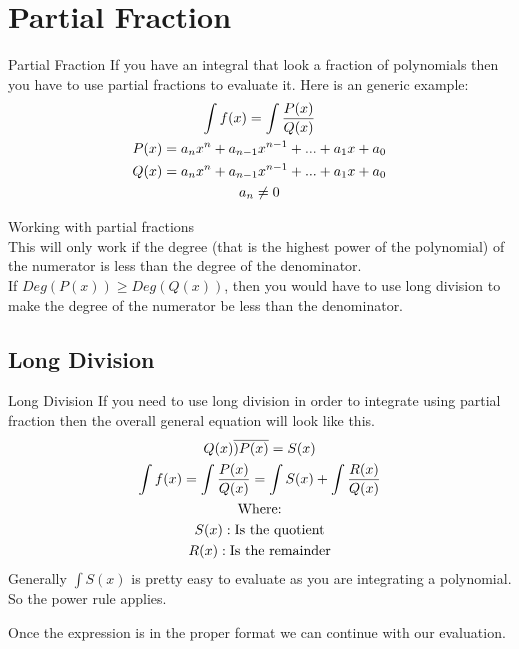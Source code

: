 \documentclass[letterpaper,10pt,twoside,twocolumn,openany]{book}
\begin{document}
\section{Partial Fraction}
\begin{paperbox}{Partial Fraction}
    If you have an integral that look a fraction of polynomials then you have to use partial fractions to evaluate it. Here is an generic example:
    \begin{gather}
        \int f(x) = \large\int \frac{P(x)}{Q(x)}\\
        \nonumber
        P(x) = a_nx^n + a_{n-1}x^{n-1} + ... + a_1x + a_0\\
        \nonumber
        Q(x) = a_nx^n + a_{n-1}x^{n-1} + ... + a_1x + a_0\\
        \nonumber
        a_n \neq 0
    \end{gather}
\end{paperbox}
\begin{commentbox}{Working with partial fractions}\\
    This will only work if the degree (that is the highest power of the polynomial) of the numerator is less than the degree of the denominator.\\
    If $Deg(P(x)) \geq Deg(Q(x)) $, then you would have to use long division to make the degree of the numerator be less than the denominator.
\end{commentbox}


\subsection{Long Division}
\begin{paperbox}{Long Division}
    If you need to use long division in order to integrate using partial fraction then the overall general equation will look like this.
    \begin{gather}
        Q(x)\overline{)P(x)} = S(x)\\
        \int f(x) = \large\int \frac{P(x)}{Q(x)} = \int S(x) + \large\int \frac{R(x)}{Q(x)}\\
        \nonumber
        \text{Where:}\\
        \nonumber
        S(x): \text{Is the quotient}\\
        \nonumber
        R(x): \text{Is the remainder}
    \end{gather}
    Generally $\int S(x)$ is pretty easy to evaluate as you are integrating a polynomial. So the power rule applies.
\end{paperbox}
Once the expression is in the proper format we can continue with our evaluation.
\newpage
\end{document}
